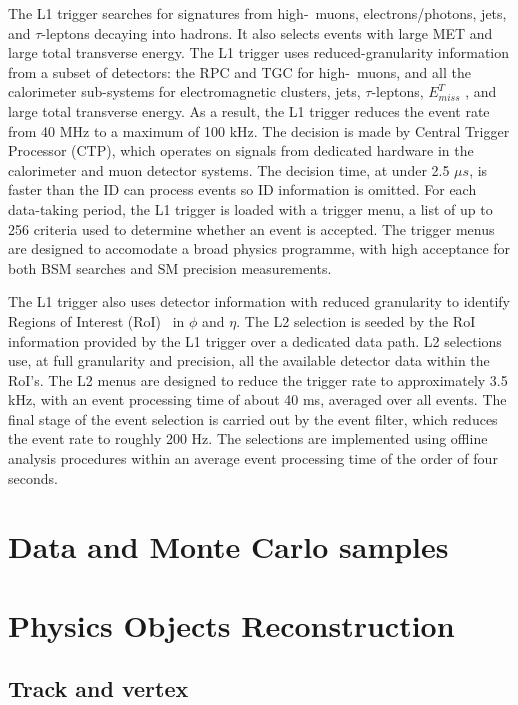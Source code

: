 \documentclass[letterpaper,12pt]{article}
\begin{document}
	The L1 trigger searches for signatures from high-\pt\ muons, electrons/photons, jets, and 
	\mbox{$\tau$-leptons} decaying into hadrons. It also selects events with large MET
	and large total transverse energy. The L1 trigger uses reduced-granularity information from a
	subset of detectors: the RPC and TGC for high-\pt\ muons, and all the calorimeter 
	sub-systems for electromagnetic clusters, jets, $\tau$-leptons, $E_{miss}^T$ ,
	and large total transverse energy.
	As a result, the L1 trigger reduces the event rate from 40 MHz to a maximum of 100 kHz.
	The decision is made by Central Trigger	Processor (CTP), 
	which operates on signals from dedicated hardware in the calorimeter
	and muon detector systems. The decision time, at under 2.5 $\mu s$, is faster than the ID
	can process events so ID information is omitted.
	For each data-taking period, the L1	trigger is loaded with a trigger menu, 
	a list of up to 256 criteria used to determine
	whether an event is accepted. The trigger menus are designed to accomodate a broad
	physics programme, with high acceptance for both BSM searches and SM precision
	measurements.

	The L1 trigger also uses detector information with reduced granularity to identify Regions
	of Interest (RoI)~\cite{Blair:2007qn} in $\phi$ and $\eta$.
	The L2 selection is seeded by the RoI information provided by the L1 trigger over a dedicated
	data path. L2 selections use, at full granularity and precision, all the available detector 
	data within the RoI’s.
	The L2 menus are designed to reduce the
	trigger rate to approximately 3.5 kHz, with an event processing time of about 40 ms,
	averaged over all events. The final stage of the event selection is carried out by 
	the event filter, which reduces the event rate to roughly 200 Hz. 
	The selections are implemented using offline analysis procedures
	within an average event processing time of the order of four seconds.
	


\section{Data and Monte Carlo samples}
\section{Physics Objects Reconstruction}
\subsection{Track and vertex}
\end{document}
